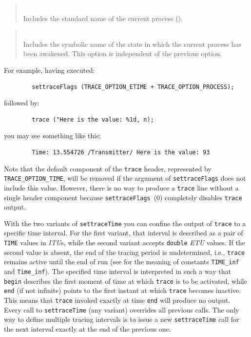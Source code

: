 \begin{quote}
\noindent{}\\ \hspace{0in}
Includes the standard name of the current process ().
\end{quote}

\begin{quote}
\noindent{}\\ \hspace{0in}
Includes the symbolic name of the state in which the current
process has been awakened.
This option is independent of the previous option.
\end{quote}

For example, having executed:
\begin{verbatim}
        settraceFlags (TRACE_OPTION_ETIME + TRACE_OPTION_PROCESS);
\end{verbatim}
followed by:
\begin{verbatim}
        trace ("Here is the value: %1d, n);
\end{verbatim}
\noindent
you may see something like this:
\begin{verbatim}
        Time: 13.554726 /Transmitter/ Here is the value: 93
\end{verbatim}
\noindent
Note that the default component of the {\tt trace} header, represented by
{\tt TRACE\_OPTION\_TIME}, will be removed if the argument of
{\tt settraceFlags}
does not include this value.
However, there is no way to produce a {\tt trace} line without a single header
component because {\tt settraceFlags}~{(0)}
completely disables {\tt trace} output.

With the two variants of {\tt settraceTime} you can confine the output of
{\tt trace} to a specific time interval.
For the first variant, that interval is described as a pair of {\tt TIME}
values in {\em ITU\/}s, while
the second variant accepts {\tt double} {\em ETU\/} values.
If the second value is absent, the end of the tracing period is undetermined,
i.e., {\tt trace} remains active until the end of run (see  for
the meaning of constants {\tt TIME\_inf} and {\tt Time\_inf}).
The specified time interval is interpreted in such a way that {\tt begin}
describes the first moment of time at which {\tt trace} is to be activated,
while {\tt end} (if not infinite)
points to the first instant at which {\tt trace} becomes
inactive.
This means that {\tt trace} invoked exactly at time {\tt end}
will produce no output.
Every call to {\tt settraceTime} (any variant) overrides all previous
calls.
The only way to define multiple tracing intervals is to issue a new
{\tt settraceTime} call for the next interval exactly at the end of the
previous one.

